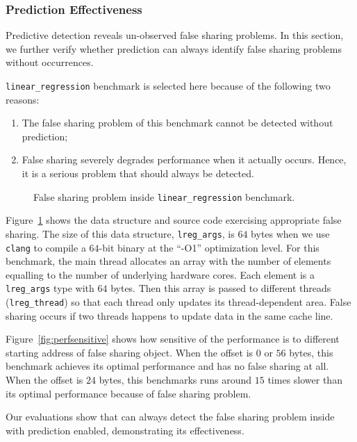 \subsubsection{Prediction Effectiveness}
\label{sec:predicteval}
Predictive detection reveals un-observed false sharing problems. In this section, we further verify whether prediction can always identify false sharing problems without occurrences.

\texttt{linear\_regression} benchmark is selected here because of the following two reasons:
\begin{enumerate}
\item
The false sharing problem of this benchmark cannot be detected without prediction; 
\item
False sharing severely degrades performance when it actually occurs. Hence, it is a serious problem that should always be detected. 
\end{enumerate}

\begin{figure}[!ht]
{\centering
\subfigure{}
\caption{False sharing problem inside \texttt{linear\_regression} benchmark.
\label{fig:linearregression}}
}
\end{figure}

Figure~\ref{fig:linearregression} shows the data structure and source code exercising appropriate false sharing. The size of this data structure, \texttt{lreg\_args}, is $64$ bytes 
when we use \texttt{clang} to compile a $64$-bit binary at the ``-O1'' optimization level. For this benchmark, the main thread allocates an array with the number of elements equalling to the number of underlying hardware cores. Each element is a \texttt{lreg\_args} type with $64$ bytes. Then this array is passed to different threads (\texttt{lreg\_thread}) so that each thread only updates its thread-dependent area. False sharing occurs if two threads happens to update data in the same cache line. 

Figure~\ref{fig:perfsensitive} shows how sensitive  of the performance is to different starting address of false sharing object. When the offset is $0$ or $56$ bytes, this benchmark achieves its optimal performance and has no false sharing at all. When the offset is $24$ bytes, this benchmarks runs around $15$ times slower than its optimal performance because of false sharing problem.

Our evaluations show that \Predator{} can always detect the false sharing problem inside with prediction enabled, demonstrating its effectiveness.

